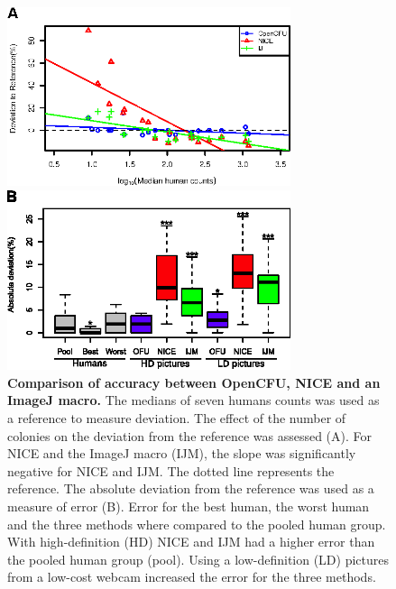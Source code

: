 \documentclass[10pt]{article}
\newcommand{\n}{seven}
\newcommand{\IJM}{IJM}
\begin{document}
\begin{figure}[!ht]
\begin{center}
\includegraphics[width=3.27in]{./figAccuracy/fig3A.eps}

\includegraphics[width=3.27in]{./figAccuracy/fig3B.eps}

\end{center}

\caption{{\bf Comparison of accuracy between OpenCFU, NICE\cite{clarke_lowcost_2010} and  an ImageJ macro\cite{cai_optimized_2011}.} 
The medians of \n{} humans counts was used as a reference to measure deviation. The effect of
the number of colonies on the deviation from the reference was assessed (A). For NICE and the ImageJ macro (\IJM), the
slope was significantly negative for NICE and \IJM{}. The dotted line represents the reference.
The absolute deviation from the reference was used as a measure of error (B). Error
for the best human, the worst human and the three methods where compared to the
pooled human group. With high-definition (HD) NICE and \IJM{} had a higher error than the pooled human
group (pool). Using a low-definition (LD) pictures from a low-cost webcam increased the error for the three methods.}
\label{figAccu}
\end{figure}


\newpage{}
% 
\end{document}
